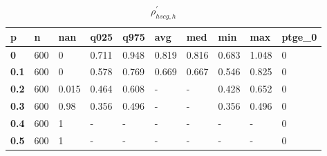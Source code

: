 \begin{table}[h]
 \centering 
\footnotesize
\caption{$\rho_{hscg,h}^\prime $}
\label{tab:alphahscgh}
\begin{tabular}[h]{|l|l|l|l|l|l|l|l|l|l|
    } \hline
\textbf{ p} & \textbf{ n} & \textbf{ nan} & \textbf{ q025} & \textbf{ q975} & \textbf{ avg} & \textbf{ med} & \textbf{ min} & \textbf{ max} & \textbf{ ptge\_0}
    \\ \hline
  \textbf{  0} & 600 &     0 & 0.711 & 0.948 & 0.819 & 0.816 & 0.683 & 1.048 & 0
    \\ \hline
  \textbf{0.1} & 600 &     0 & 0.578 & 0.769 & 0.669 & 0.667 & 0.546 & 0.825 & 0
    \\ \hline
  \textbf{0.2} & 600 & 0.015 & 0.464 & 0.608 & - & - & 0.428 & 0.652 & 0
    \\ \hline
  \textbf{0.3} & 600 &  0.98 & 0.356 & 0.496 & - & - & 0.356 & 0.496 & 0
    \\ \hline
  \textbf{0.4} & 600 &     1 & - & - & - & - & - & - & 0
    \\ \hline
  \textbf{0.5} & 600 &     1 & - & - & - & - & - & - & 0
    \\ \hline
 \end{tabular}
 \end{table}
